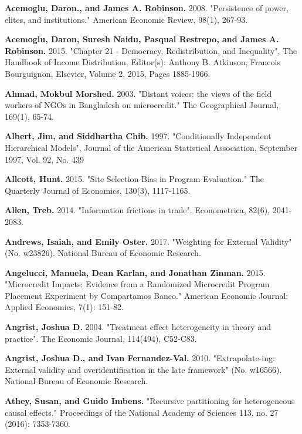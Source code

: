 \documentclass[AER]{AEA}
\begin{document}
\begin{thebibliography}{99}

 \textbf{Acemoglu, Daron., and James A. Robinson.} 2008. "Persistence of power, elites, and institutions." American Economic Review, 98(1), 267-93.

 \textbf{ Acemoglu, Daron, Suresh Naidu, Pasqual Restrepo, and James A. Robinson.} 2015. "Chapter 21 - Democracy, Redistribution, and Inequality", The Handbook of Income Distribution, Editor(s): Anthony B. Atkinson, Francois Bourguignon, Elsevier, Volume 2, 2015, Pages 1885-1966.

 \textbf{ Ahmad, Mokbul Morshed.} 2003. "Distant voices: the views of the field workers of NGOs in Bangladesh on microcredit." The Geographical Journal, 169(1), 65-74.

 \textbf{ Albert, Jim, and Siddhartha Chib.} 1997. "Conditionally Independent Hierarchical Models", Journal of the American Statistical Association, September 1997, Vol. 92, No. 439

 \textbf{ Allcott, Hunt.} 2015. "Site Selection Bias in Program Evaluation." The Quarterly Journal of Economics, 130(3), 1117-1165.

 \textbf{ Allen, Treb.} 2014. "Information frictions in trade". Econometrica, 82(6), 2041-2083.

\textbf{  Andrews, Isaiah, and Emily Oster.} 2017. "Weighting for External Validity" (No. w23826). National Bureau of Economic Research.

 \textbf{ Angelucci, Manuela, Dean Karlan, and Jonathan Zinman.} 2015. "Microcredit Impacts: Evidence from a Randomized Microcredit Program Placement Experiment by Compartamos Banco." American Economic Journal: Applied Economics, 7(1): 151-82.

 \textbf{ Angrist, Joshua D.} 2004. "Treatment effect heterogeneity in theory and practice". The Economic Journal, 114(494), C52-C83.

 \textbf{ Angrist, Joshua D., and Ivan Fernandez-Val.} 2010. "Extrapolate-ing: External validity and overidentification in the late framework" (No. w16566). National Bureau of Economic Research.

 \textbf{ Athey, Susan, and Guido Imbens.} "Recursive partitioning for heterogeneous causal effects." Proceedings of the National Academy of Sciences 113, no. 27 (2016): 7353-7360.


\end{thebibliography}
\end{document}
